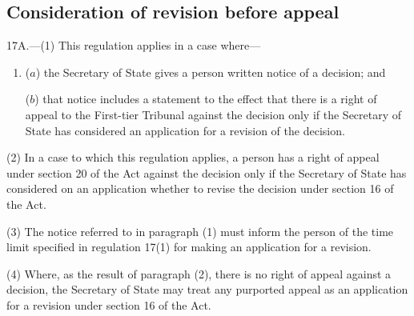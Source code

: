 \documentclass[a4paper,12pt]{article}
\begin{document}

\subsection[17A. Consideration of revision before appeal]{Consideration of revision before appeal}

17A.---(1)  This regulation applies in a case where—
\begin{enumerate}\item[]
($a$) the Secretary of State gives a person written notice of a decision; and

($b$) that notice includes a statement to the effect that there is a right of appeal to the First-tier Tribunal against the decision only if the Secretary of State has considered an application for a revision of the decision.
\end{enumerate}

(2) In a case to which this regulation applies, a person has a right of appeal under section 20 of the Act against the decision only if the Secretary of State has considered on an application whether to revise the decision under section 16 of the Act.

(3) The notice referred to in paragraph (1) must inform the person of the time limit specified in regulation 17(1) for making an application for a revision.

(4) Where, as the result of paragraph (2), there is no right of appeal against a decision, the Secretary of State may treat any purported appeal as an application for a revision under section 16 of the Act.
\end{document}
